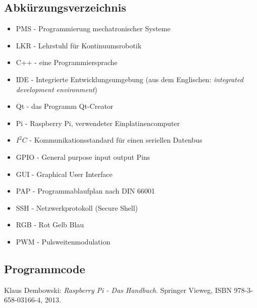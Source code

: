 \documentclass[12pt,a4paper,oneside]{article}
\begin{document}
\begin{spacing}{1.15}
\begin{appendix}
		\section{Abkürzungsverzeichnis}
	\end{appendix}
	\begin{itemize}
		\item PMS - Programmierung mechatronischer Systeme
		\item LKR - Lehrstuhl für Kontinuumsrobotik
		\item C++ - eine Programmiersprache
		\item IDE - Integrierte Entwicklungsumgebung (aus dem Englischen: \textit{integrated development environment})
		\item Qt - das Programm Qt-Creator  
		\item Pi - Raspberry Pi, verwendeter Einplatinencomputer
		\item $I^{2}C$ - Kommunikationsstandard für einen seriellen Datenbus
		\item GPIO - General purpose input output Pins
		\item GUI - Graphical User Interface
		\item PAP - Programmablaufplan nach DIN 66001
		\item SSH - Netzwerkprotokoll (Secure Shell)
		\item RGB - Rot Gelb Blau
		\item PWM - Pulsweitenmodulation 
	\end{itemize} 
	
	
	\clearpage  
	\begin{appendix}
	\section{Programmcode}
	\end{appendix}
    \clearpage  
    \begin{thebibliography}{50}
   		 Klaus Dembowski: \textit{Raspberry Pi - Das Handbuch}. Springer Vieweg, ISBN 978-3-658-03166-4, 2013.
	\end{thebibliography}

\end{spacing}
\end{document}
